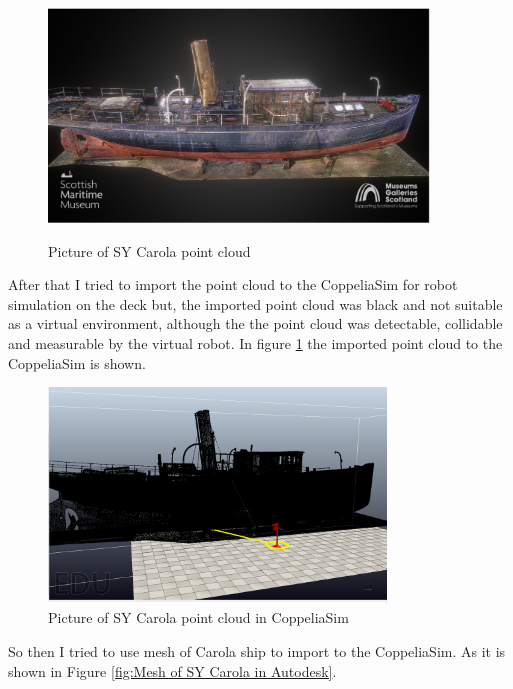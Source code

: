 \begin{figure}[H]
  \centering
  \includegraphics[width= 0.9\textwidth]{Figures/Crolaship.PNG}
  \caption[Picture of Visualized SY Carola Point Cloud]{Picture of SY Carola point cloud} \cite{Carolaship}
   \label{fig:SY Carola point cloud}
\end{figure}
\noindent After that I tried to import the point cloud to the CoppeliaSim for robot simulation on the deck but, the imported point cloud was black and not suitable as a virtual environment, although the the point cloud was detectable, collidable and measurable by the virtual robot. In figure \ref{fig:SY Carola point cloud} the imported point cloud to the CoppeliaSim is shown. 
\begin{figure}[H]
  \centering
  \includegraphics[width= 0.8\textwidth]{Figures/ship point clould in Coppeliasim.PNG}
  \caption[Picture of SY Carola Point Cloud in CoppeliaSim]{Picture of SY Carola point cloud in CoppeliaSim}
   \label{fig:Carola point cloud in CoppeliaSim}
\end{figure}
\noindent So then I tried to use mesh of Carola ship to import to the CoppeliaSim. As it is shown in Figure \ref{fig:Mesh of SY Carola in Autodesk}. 

